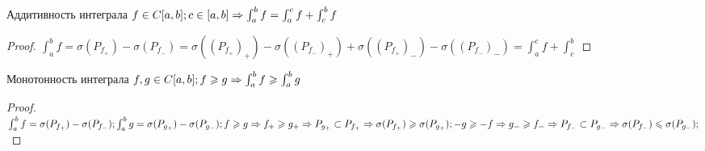 \begin{theorem}{Аддитивность интеграла}
	$f \in C[a, b]; c \in [a, b] \Rightarrow \int_a^b f = \int_a^c f + \int_c^b f$
\end{theorem}
\begin{proof}
	$ \int_a^b f = \sigma (P_{f_+}) - \sigma (P_{f_-}) = \sigma ((P_{f_+})_+) - \sigma ((P_{f_-})_+) + \sigma ((P_{f_+})_-) - \sigma ((P_{f_-})_-) = \int_a^c f + \int_c^b $
\end{proof}

\begin{theorem}{Монотонность интеграла}
	$ f, g \in C[a, b]; f \geqslant g \Rightarrow \int_a^b f \geqslant \int_a^b g $
\end{theorem}
\begin{proof}
	$ \int_a^b f = \sigma (P_{f_+}) - \sigma (P_{f_-}); \int_a^b g = \sigma (P_{g_+}) - \sigma (P_{g_-});
	f \geqslant g \Rightarrow f_+ \geqslant g_+ \Rightarrow P_{g_+} \subset P_{f_+} \Rightarrow \sigma(P_{f_+}) \geqslant \sigma(P_{g_+});
	-g \geqslant -f \Rightarrow  g_-  \geqslant f_- \Rightarrow P_{f_-} \subset P_{g_-} \Rightarrow \sigma(P_{f_-}) \leqslant \sigma(P_{g_-});$
\end{proof}